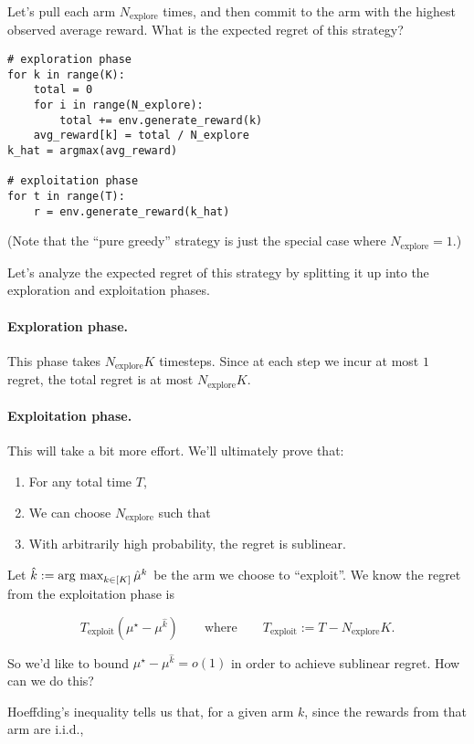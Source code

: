 \documentclass[../main/main]{subfiles}
\begin{document}
Let's pull each arm $N_{\text{explore}}$ times, and then commit to the arm with the highest observed average reward. What is the expected regret of this strategy?

\begin{lstlisting}
# exploration phase
for k in range(K):
    total = 0
    for i in range(N_explore):
        total += env.generate_reward(k)
    avg_reward[k] = total / N_explore
k_hat = argmax(avg_reward)

# exploitation phase
for t in range(T):
    r = env.generate_reward(k_hat)
\end{lstlisting}

(Note that the ``pure greedy'' strategy is just the special case where $N_{\text{explore}} = 1$.)

Let's analyze the expected regret of this strategy by splitting it up into the exploration and exploitation phases.

\paragraph*{Exploration phase.} This phase takes $N_{\text{explore}} K$ timesteps. Since at each step we incur at most $1$ regret, the total regret is at most $N_{\text{explore}} K$.

\paragraph*{Exploitation phase.} This will take a bit more effort. We'll ultimately prove that:

\begin{enumerate}
    \item For any total time $T$,
    \item We can choose $N_{\text{explore}}$ such that
    \item With arbitrarily high probability, the regret is sublinear.
\end{enumerate}

Let $\hat k := \operatorname*{\textrm{arg\ max}}_{k \in [K]} \hat \mu^k$ be the arm we choose to ``exploit''. We know the regret from the exploitation phase is

\[
    T_{\text{exploit}} (\mu^\star - \mu^{\hat k}) \qquad \text{where} \qquad T_{\text{exploit}} := T - N_{\text{explore}} K.
\]

So we'd like to bound $\mu^\star - \mu^{\hat k} = o(1)$ in order to achieve sublinear regret. How can we do this?

Hoeffding's inequality tells us that, for a given arm $k$, since the rewards from that arm are i.i.d.,
\end{document}
